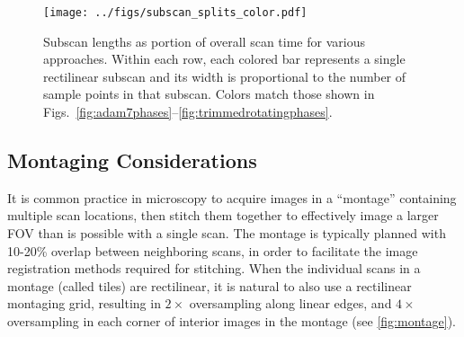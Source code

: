\documentclass[aip, amsmath, amssymb, nobibnotes, nofootinbib, citeautoscript, reprint, superscriptaddress]{revtex4-1}
\begin{document}
    \begin{figure*}
        \centering
        \texttt{[image: ../figs/subscan\_splits\_color.pdf]}
        \caption{
        \label{fig:subscanlengths} 
        Subscan lengths as portion of overall scan time for various approaches.
        Within each row, each colored bar represents a single rectilinear subscan and its width is proportional to the number of sample points in that subscan.
            Colors match those shown in
            Figs.~\autoref{fig:adam7phases}--\autoref{fig:trimmedrotatingphases}.
        }
    \end{figure*}


    \subsection{Montaging Considerations}
    \label{sec:montaging}

    It is common practice in microscopy to acquire images in a
    ``montage'' containing multiple scan locations, then stitch them together to
    effectively image a larger FOV than is possible with a single scan.
    The montage is typically planned with 10-20\% overlap between neighboring scans,
    in order to facilitate the image registration methods required for stitching.
    When the individual scans in a montage (called tiles) are rectilinear, it is
    natural to also use a rectilinear montaging grid, resulting in $2\times$ oversampling
    along linear edges, and $4\times$ oversampling in each corner of interior images in
    the montage (see \autoref{fig:montage}).
\end{document}
